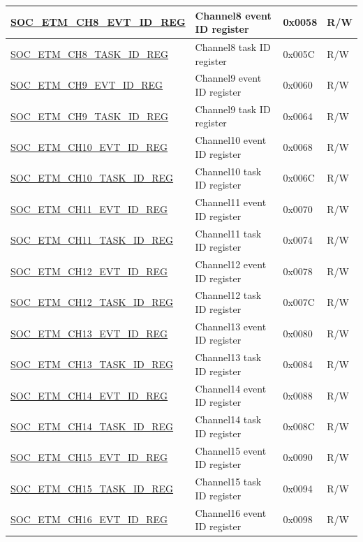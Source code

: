 \begin{longtable}{ | p{6cm} | p{6.2cm} | p{1.3cm} | p{2cm} | }
\hyperref[regdesc:SOCETMCHNEVTIDREG]{SOC\_ETM\_CH8\_EVT\_ID\_REG} & Channel8 event ID register & 0x0058 & R/W \\ \hline
\hyperref[regdesc:SOCETMCHNTASKIDREG]{SOC\_ETM\_CH8\_TASK\_ID\_REG} & Channel8 task ID register & 0x005C & R/W \\ \hline
\hyperref[regdesc:SOCETMCHNEVTIDREG]{SOC\_ETM\_CH9\_EVT\_ID\_REG} & Channel9 event ID register & 0x0060 & R/W \\ \hline
\hyperref[regdesc:SOCETMCHNTASKIDREG]{SOC\_ETM\_CH9\_TASK\_ID\_REG} & Channel9 task ID register & 0x0064 & R/W \\ \hline
\hyperref[regdesc:SOCETMCHNEVTIDREG]{SOC\_ETM\_CH10\_EVT\_ID\_REG} & Channel10 event ID register & 0x0068 & R/W \\ \hline
\hyperref[regdesc:SOCETMCHNTASKIDREG]{SOC\_ETM\_CH10\_TASK\_ID\_REG} & Channel10 task ID register & 0x006C & R/W \\ \hline
\hyperref[regdesc:SOCETMCHNEVTIDREG]{SOC\_ETM\_CH11\_EVT\_ID\_REG} & Channel11 event ID register & 0x0070 & R/W \\ \hline
\hyperref[regdesc:SOCETMCHNTASKIDREG]{SOC\_ETM\_CH11\_TASK\_ID\_REG} & Channel11 task ID register & 0x0074 & R/W \\ \hline
\hyperref[regdesc:SOCETMCHNEVTIDREG]{SOC\_ETM\_CH12\_EVT\_ID\_REG} & Channel12 event ID register & 0x0078 & R/W \\ \hline
\hyperref[regdesc:SOCETMCHNTASKIDREG]{SOC\_ETM\_CH12\_TASK\_ID\_REG} & Channel12 task ID register & 0x007C & R/W \\ \hline
\hyperref[regdesc:SOCETMCHNEVTIDREG]{SOC\_ETM\_CH13\_EVT\_ID\_REG} & Channel13 event ID register & 0x0080 & R/W \\ \hline
\hyperref[regdesc:SOCETMCHNTASKIDREG]{SOC\_ETM\_CH13\_TASK\_ID\_REG} & Channel13 task ID register & 0x0084 & R/W \\ \hline
\hyperref[regdesc:SOCETMCHNEVTIDREG]{SOC\_ETM\_CH14\_EVT\_ID\_REG} & Channel14 event ID register & 0x0088 & R/W \\ \hline
\hyperref[regdesc:SOCETMCHNTASKIDREG]{SOC\_ETM\_CH14\_TASK\_ID\_REG} & Channel14 task ID register & 0x008C & R/W \\ \hline
\hyperref[regdesc:SOCETMCHNEVTIDREG]{SOC\_ETM\_CH15\_EVT\_ID\_REG} & Channel15 event ID register & 0x0090 & R/W \\ \hline
\hyperref[regdesc:SOCETMCHNTASKIDREG]{SOC\_ETM\_CH15\_TASK\_ID\_REG} & Channel15 task ID register & 0x0094 & R/W \\ \hline
\hyperref[regdesc:SOCETMCHNEVTIDREG]{SOC\_ETM\_CH16\_EVT\_ID\_REG} & Channel16 event ID register & 0x0098 & R/W \\ \hline

\end{longtable}

